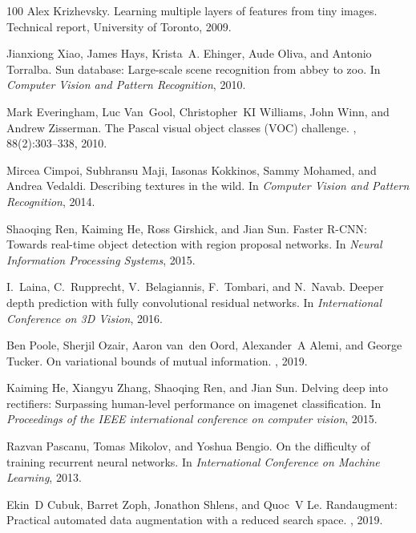 \documentclass{article}
\begin{document}
{\begin{thebibliography}{100}
Alex Krizhevsky.
\newblock Learning multiple layers of features from tiny images.
\newblock Technical report, University of Toronto, 2009.

Jianxiong {Xiao}, James {Hays}, Krista~A. {Ehinger}, Aude {Oliva}, and Antonio
  {Torralba}.
\newblock Sun database: Large-scale scene recognition from abbey to zoo.
\newblock In {\em Computer Vision and Pattern Recognition}, 2010.

Mark Everingham, Luc Van~Gool, Christopher~KI Williams, John Winn, and Andrew
  Zisserman.
\newblock The {P}ascal visual object classes ({VOC}) challenge.
, 88(2):303--338, 2010.

Mircea Cimpoi, Subhransu Maji, Iasonas Kokkinos, Sammy Mohamed, and Andrea
  Vedaldi.
\newblock Describing textures in the wild.
\newblock In {\em Computer Vision and Pattern Recognition}, 2014.

Shaoqing Ren, Kaiming He, Ross Girshick, and Jian Sun.
\newblock Faster {R-CNN}: Towards real-time object detection with region
  proposal networks.
\newblock In {\em Neural Information Processing Systems}, 2015.

I.~{Laina}, C.~{Rupprecht}, V.~{Belagiannis}, F.~{Tombari}, and N.~{Navab}.
\newblock Deeper depth prediction with fully convolutional residual networks.
\newblock In {\em International Conference on 3D Vision}, 2016.

Ben Poole, Sherjil Ozair, Aaron van~den Oord, Alexander~A Alemi, and George
  Tucker.
\newblock On variational bounds of mutual information.
, 2019.

Kaiming He, Xiangyu Zhang, Shaoqing Ren, and Jian Sun.
\newblock Delving deep into rectifiers: Surpassing human-level performance on
  imagenet classification.
\newblock In {\em Proceedings of the IEEE international conference on computer
  vision}, 2015.

Razvan Pascanu, Tomas Mikolov, and Yoshua Bengio.
\newblock On the difficulty of training recurrent neural networks.
\newblock In {\em International Conference on Machine Learning}, 2013.

Ekin~D Cubuk, Barret Zoph, Jonathon Shlens, and Quoc~V Le.
\newblock Randaugment: Practical automated data augmentation with a reduced
  search space.
, 2019.


\end{thebibliography}}
\end{document}
